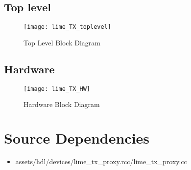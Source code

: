 \subsection*{Top level}
\begin{figure}[ht]
	\centerline{\texttt{[image: lime\_TX\_toplevel]}}
	\caption{Top Level Block Diagram}
	\label{fig:top}
\end{figure}
\vspace{25 mm}

\subsection*{Hardware}
\begin{figure}[ht]
	\centerline{\texttt{[image: lime\_TX\_HW]}}
	\caption{Hardware Block Diagram}
	\label{fig:hw}
\end{figure}
\vspace{25 mm}

\section*{Source Dependencies}
\begin{itemize}
	\item assets/hdl/devices/lime\_tx\_proxy.rcc/lime\_tx\_proxy.cc
\end{itemize}

